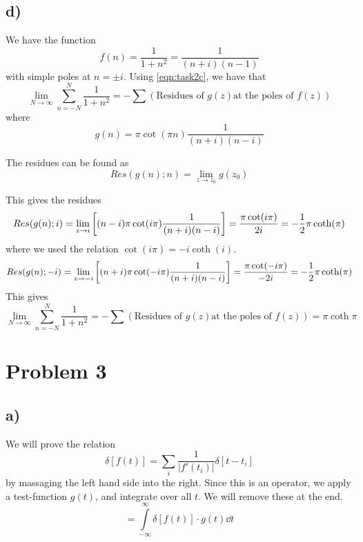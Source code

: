 \documentclass[10pt,a4paper]{article}
\newcommand{\infint}{\int\limits_{-\infty}^{\infty}}
\newcommand{\limN}{\lim_{N\rightarrow \infty}}
\begin{document}
\subsection*{d)}
We have the function
\begin{equation}
    f(n) = \frac{1}{1+n^2} = \frac{1}{(n+i)(n-1)}
\end{equation}
with simple poles at $n = \pm i$. Using \ref{eqn:task2c}, we have that
\begin{equation}
    \limN \sum_{n=-N}^{N} \frac{1}{1+n^2} = - \sum(\text{Residues of } g(z) \text{at the poles of } f(z))
\end{equation}
where
\begin{equation}
    g(n) = \pi\cot(\pi n) \frac{1}{(n+i)(n-i)}
\end{equation}

The residues can be found as
\begin{equation}
    Res(g(n); n) = \lim_{z\rightarrow z_0} g(z_0)
\end{equation}

This gives the residues
\begin{align}
    Res(g(n); i) = \lim_{z\rightarrow i}\qty[(n-i)\pi\cot(i\pi)\frac{1}{(n+i)(n-i)}] = \frac{\pi\cot(i\pi)}{2i} = -\frac{1}{2}\pi\coth(\pi)
\end{align}
where we used the relation $\cot(i\pi) = -i\coth(i)$.
\begin{align}
    Res(g(n); -i) = \lim_{z\rightarrow -i}\qty[(n+i)\pi\cot(-i\pi)\frac{1}{(n+i)(n-i)}] = \frac{\pi\cot(-i\pi)}{-2i} = -\frac{1}{2}\pi\coth(\pi)
\end{align}
This gives
\begin{equation}
    \limN \sum_{n=-N}^{N} \frac{1}{1+n^2} = - \sum(\text{Residues of } g(z) \text{at the poles of } f(z)) = \pi \coth{\pi}
\end{equation}





\section*{Problem 3}
\subsection*{a)}
We will prove the relation
\begin{equation}\label{eqn:task3a}
    \delta[f(t)] = \sum_i \frac{1}{|f'(t_i)|}\delta[t-t_i]
\end{equation}
by massaging the left hand side into the right. Since this is an operator, we apply a test-function $g(t)$, and integrate over all $t$. We will remove these at the end.
\begin{equation}
    = \infint \delta[f(t)]\cdot g(t)\dd{t}
\end{equation}
\end{document}
